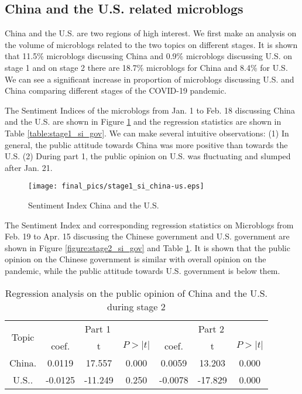 \documentclass[sigconf, nonacm=true]{acmart}
\begin{document}
\subsection{China and the U.S. related microblogs}
China and the U.S. are two regions of high interest. 
We first make an analysis on the volume of microblogs related to the two topics on different stages.
It is shown that 11.5\% microblogs discussing China and 0.9\% microblogs discussing U.S. on stage 1 and on stage 2 there are 18.7\% microblogs for China and 8.4\% for U.S.
We can see a significant increase in proportion of microblogs discussing U.S. and China comparing different stages of the COVID-19 pandemic.

The Sentiment Indices of the microblogs from Jan. 1 to Feb. 18 discussing China and the U.S. are shown in Figure \ref{figure:stage1_si_gov} and the regression statistics are shown in Table \ref{table:stage1_si_gov}.
We can make several intuitive observations:
(1) In general, the public attitude towards China was more positive than towards the U.S.
(2) During part 1, the public opinion on U.S. was fluctuating and slumped after Jan. 21.
\begin{figure}[t]
  \texttt{[image: final\_pics/stage1\_si\_china-us.eps]}
  \caption{Sentiment Index China and the U.S.}
  \label{figure:stage1_si_gov}
\end{figure}


The Sentiment Index and corresponding regression statistics on Microblogs from Feb. 19 to Apr. 15 discussing the Chinese government and U.S. government are shown in Figure \ref{figure:stage2_si_gov} and Table \ref{table:stage2_si_gov}.
It is shown that the public opinion on the Chinese government is similar with overall opinion on the pandemic, while the public attitude towards U.S. government is below them.
\begin{table}[h]
\small%
\begin{tabular}{|c|c|c|c|c|c|c|}
\hline
\multirow{2}{*}{Topic} & \multicolumn{3}{c|}{Part 1} & \multicolumn{3}{c|}{Part 2} \\\cline{2-7}
                  &  coef.     &    t   &   $P>|t|$   &     coef.  &    t   &  $P>|t|$    \\\hline
                  China.&   0.0119   &     17.557  &   0.000       &   0.0059    &     13.203    &   0.000    \\\hline
                  U.S..    &       -0.0125   &    -11.249      &      0.250      &   -0.0078    &    -17.829    &     0.000         \\\hline
\end{tabular}
\vspace{0.2cm}
\caption{Regression analysis on the public opinion of China and the U.S. during stage 2}
\vspace{0.2cm}
\label{table:stage2_si_gov}
\end{table}
\end{document}

